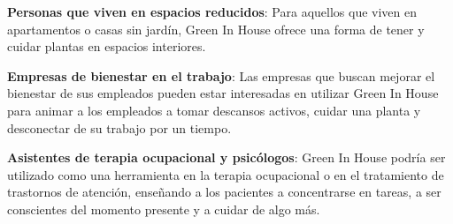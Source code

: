 \textbf{Personas que viven en espacios reducidos}: Para aquellos que viven en apartamentos o casas sin jardín, Green In House ofrece una forma de tener y cuidar plantas en espacios interiores.

\textbf{Empresas de bienestar en el trabajo}: Las empresas que buscan mejorar el bienestar de sus empleados pueden estar interesadas en utilizar Green In House para animar a los empleados a tomar descansos activos, cuidar una planta y desconectar de su trabajo por un tiempo.

\textbf{Asistentes de terapia ocupacional y psicólogos}: Green In House podría ser utilizado como una herramienta en la terapia ocupacional o en el tratamiento de trastornos de atención, enseñando a los pacientes a concentrarse en tareas, a ser conscientes del momento presente y a cuidar de algo más.